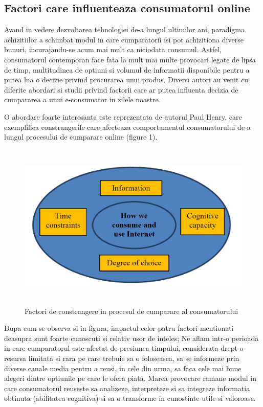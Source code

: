 \documentclass[a4paper, 12pt]{article}
\begin{document}
	\subsection{Factori care influenteaza consumatorul online}
	\qquad\space Avand in vedere dezvoltarea tehnologiei de-a lungul ultimilor ani,  paradigma achizitiilor a schimbat modul in care cumparatorii isi pot achizitiona diverse bunuri, incurajandu-se acum mai mult ca niciodata consumul. Astfel, consumatorul contemporan face fata la mult mai multe provocari legate de lipsa de timp, multitudinea de optiuni si volumul de informatii disponibile pentru a putea lua o decizie privind procurarea unui produs. Diversi autori au venit cu diferite abordari si studii privind factorii care ar putea influenta decizia de cumpararea a unui e-consumator in zilele noastre.
	
	\quad O abordare foarte interesanta este reprezentata de autorul Paul Henry, care exemplifica constrangerile care afecteaza comportamentul consumatorului de-a lungul procesului de cumparare online (figure 1).
	\begin{figure}[!htb]
		\centering
		\includegraphics[width=13cm, height=8cm]{"figures/first.png"}
		\caption{Factori de constrangere in procesul de cumparare al consumatorului}\label{fig:first}
	\end{figure}

	\quad Dupa cum se observa si in figura, impactul celor patru factori mentionati deasupra sunt foarte cunoscuti si relativ usor de inteles; Ne aflam intr-o perioada in care cumparatorul este afectat de presiunea timpului, considerata drept o resursa limitata si rara pe care trebuie sa o foloseasca, sa se informeze prin diverse canale media pentru a reusi, in cele din urma, sa faca cele mai bune alegeri dintre optiunile pe care le ofera piata. Marea provocare ramane modul in care consumatorul reuseste sa analizeze, interpreteze si sa integreze informatia obtinuta (abilitatea cognitiva) si sa o transforme in cunostinte utile si valoroase.
	
\end{document}

